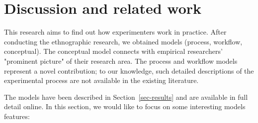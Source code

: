 \section{Discussion and related work}\label{sec-related}
This research aims to find out how experimenters work in practice. After conducting the ethnographic research, we obtained models (process, workflow, conceptual). The conceptual model connects with empirical researchers' "prominent picture" of their research area. The process and workflow models represent a novel contribution; to our knowledge, such detailed descriptions of the experimental process are not available in the existing literature.

The models have been described in Section~\ref{sec-results} and are available in full detail online. In this section, we would like to focus on some interesting models features:


